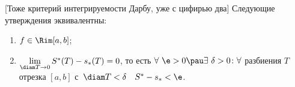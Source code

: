[Тоже критерий интегрируемости Дарбу, уже с цифирью два]
 	Следующие утверждения эквивалентны:
 	\begin{enumerate}
 	  \item $f\in\Rim[a,b]$;
 	  \item \(\lim\limits_{\diam T\to 0}S^*(T)-s_*(T)=0\), то есть $\forall\ \e>0\pau\exists\ \delta>0\colon \forall$ разбиения  $T$ отрезка $[a,b]$
с~$\diam T<\delta \quad S^*-s_*<\e$.
 	\end{enumerate}
 